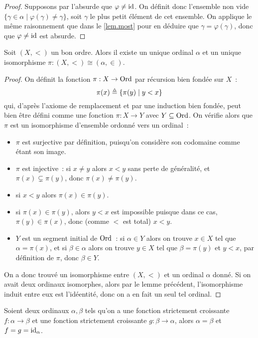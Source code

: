 \begin{proof}
  Supposons par l'absurde que $\varphi\neq\operatorname{id}$. On définit donc l'ensemble non
  vide $\{\gamma \in \alpha \mid \varphi(\gamma)\neq\gamma\}$, soit $\gamma$
  le plus petit élément de cet ensemble. On applique le même raisonnement que
  dans le \cref{lem.most} pour en déduire que $\gamma = \varphi(\gamma)$, donc
  que $\varphi\neq\operatorname{id}$ est absurde.
\end{proof}

\begin{proposition}
  Soit $(X,<)$ un bon ordre. Alors il existe un unique ordinal $\alpha$ et un
  unique isomorphisme $\pi : (X,<)\cong (\alpha,\in)$.
\end{proposition}

\begin{proof}
  On définit la fonction $\pi : X \to \operatorname{Ord}$ par récursion bien fondée sur
  $X$~:
  \[\pi(x)\triangleq \{ \pi(y) \mid y < x\}\]
  qui, d'après l'axiome de remplacement et par une induction bien fondée,
  peut bien être défini comme une fonction $\pi : X \to Y$ avec
  $Y\subseteq \operatorname{Ord}$. On vérifie alors que $\pi$ est un isomorphisme d'ensemble
  ordonné vers un ordinal~:
  \begin{itemize}
  \item $\pi$ est surjective par définition, puisqu'on considère son codomaine
    comme étant son image.
  \item $\pi$ est injective~: si $x\neq y$ alors $x < y$ sans perte de
    généralité, et $\pi(x) \subsetneq \pi(y)$, donc $\pi(x)\neq\pi(y)$.
  \item si $x < y$ alors $\pi(x) \in \pi(y)$.
  \item si $\pi(x) \in \pi(y)$, alors $y < x$ est impossible puisque dans ce
    cas, $\pi(y) \in \pi(x)$, donc (comme $<$ est total) $x < y$.
  \item $Y$ est un segment initial de $\operatorname{Ord}$~: si $\alpha \in Y$ alors on trouve
    $x \in X$ tel que $\alpha = \pi(x)$, et si $\beta \in \alpha$ alors
    on trouve $y\in X$ tel que $\beta = \pi(y)$ et $y < x$, par définition de
    $\pi$, donc $\beta \in Y$.
  \end{itemize}
  On a donc trouvé un isomorphisme entre $(X,<)$ et un ordinal $\alpha$ donné.
  Si on avait deux ordinaux isomorphes, alors par le lemme précédent,
  l'isomorphisme induit entre eux est l'idéentité, donc on a en fait un seul
  tel ordinal.
\end{proof}

\begin{corollary}
  Soient deux ordinaux $\alpha,\beta$ tels qu'on a une fonction strictement
  croissante $f : \alpha \to \beta$ et une fonction strictement croissante
  $g : \beta \to \alpha$, alors $\alpha = \beta$ et $f = g = \operatorname{id}_\alpha$.
\end{corollary}

